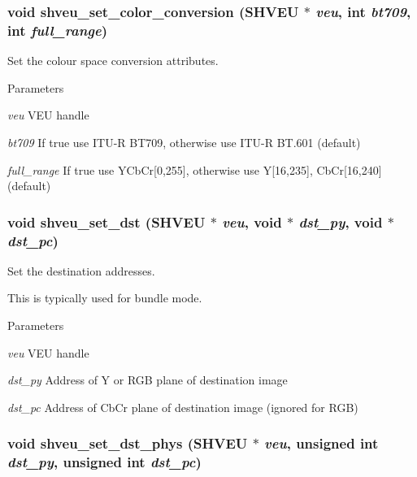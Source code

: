 \subsubsection[{shveu\_\-set\_\-color\_\-conversion}]{\setlength{\rightskip}{0pt plus 5cm}void shveu\_\-set\_\-color\_\-conversion (SHVEU $\ast$ {\em veu}, \/  int {\em bt709}, \/  int {\em full\_\-range})}\label{veu__colorspace_8h_ac74be0ae955a37145f16e872f36932d4}


Set the colour space conversion attributes. 


\begin{DoxyParams}{Parameters}
\item[{\em veu}]VEU handle \item[{\em bt709}]If true use ITU-\/R BT709, otherwise use ITU-\/R BT.601 (default) \item[{\em full\_\-range}]If true use YCbCr[0,255], otherwise use Y[16,235], CbCr[16,240] (default) \end{DoxyParams}
\subsubsection[{shveu\_\-set\_\-dst}]{\setlength{\rightskip}{0pt plus 5cm}void shveu\_\-set\_\-dst (SHVEU $\ast$ {\em veu}, \/  void $\ast$ {\em dst\_\-py}, \/  void $\ast$ {\em dst\_\-pc})}\label{veu__colorspace_8h_a05f37b480ffc86659c972655a8c5b7d1}


Set the destination addresses. 

This is typically used for bundle mode. 
\begin{DoxyParams}{Parameters}
\item[{\em veu}]VEU handle \item[{\em dst\_\-py}]Address of Y or RGB plane of destination image \item[{\em dst\_\-pc}]Address of CbCr plane of destination image (ignored for RGB) \end{DoxyParams}
\subsubsection[{shveu\_\-set\_\-dst\_\-phys}]{\setlength{\rightskip}{0pt plus 5cm}void shveu\_\-set\_\-dst\_\-phys (SHVEU $\ast$ {\em veu}, \/  unsigned int {\em dst\_\-py}, \/  unsigned int {\em dst\_\-pc})}\label{veu__colorspace_8h_aaaae7a664ff33eaed19ab7c94f3bb583}


